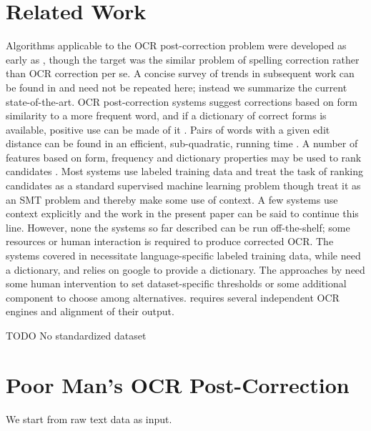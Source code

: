 \documentclass{sig-alternate}
\begin{document}
\section{Related Work}
Algorithms applicable to the OCR post-correction problem were
developed as early as \cite{ocr:Damerau}, though the target was the
similar problem of spelling correction rather than OCR correction per
se. A concise survey of trends in subsequent work can be found in
\cite[6-13]{ocr:Niklas} \cite[1347-1348]{ocr:Reffle} and need not be
repeated here; instead we summarize the current state-of-the-art. OCR
post-correction systems suggest corrections based on form similarity
to a more frequent word, and if a dictionary of correct forms is
available, positive use can be made of it \cite{ocr:Eger}. Pairs of
words with a given edit distance can be found in an efficient,
sub-quadratic, running time \cite{ocr:Reynaert:Corpus-Clean}. A
number of features based on form, frequency and dictionary properties
may be used to rank candidates \cite{ocr:Evershed}. Most systems use
labeled training data and treat the task of ranking candidates as a
standard supervised machine learning problem \cite{ocr:Reffle,ocr:Mei}
though \cite{ocr:Afli,ocr:AfliWay} treat it as an SMT problem and
thereby make some use of context. A few systems use context explicitly
\cite{ocr:Tong} and the work in the present paper can be said to
continue this line. However, none the systems so far described can be
run off-the-shelf; some resources or human interaction is required to
produce corrected OCR. The systems covered in
\cite{ocr:Afli,ocr:AfliWay,ocr:Reffle,ocr:Mei,ocr:Eger} necessitate
language-specific labeled training data, while
\cite{ocr:Kettunen,ocr:KissosDershowitz} need a dictionary, and
\cite{ocr:Bassil} relies on google to provide a dictionary.  The
approaches by \cite{ocr:Evershed,ocr:Reynaert:2016,ocr:Tong} need some
human intervention to set dataset-specific thresholds or some
additional component to choose among alternatives. \cite{ocr:Lund}
requires several independent OCR engines and alignment of their
output.


TODO No standardized dataset

\section{Poor Man's OCR Post-Correction}
We start from raw text data as input.
\end{document}
